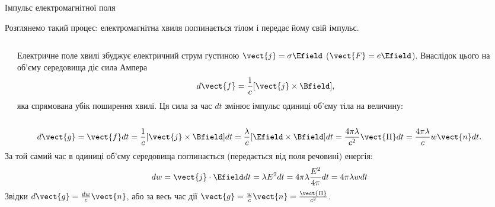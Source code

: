\documentclass[onlytextwidth]{beamer}
\begin{document}
\begin{frame}{Імпульс електромагнітної поля}{}
	\begin{block}{}
		Розглянемо такий процес: електромагнітна хвиля поглинається тілом і передає йому свій імпульс.
	\end{block}
	\begin{columns}
		\begin{column}{0.4\linewidth}\centering
			
		\end{column}
		\begin{column}{0.6\linewidth}
			\begin{block}{}\justifying\small
				Електричне поле хвилі збуджує електричний струм густиною $ \vect{j} = \sigma\Efield $ ($ \vect{F} = e\Efield $). Внаслідок цього на
				об'єму середовища діє сила Ампера
				\begin{equation*}
					d\vect{f} = \frac1c[\vect{j}\times\Bfield],
				\end{equation*}
				яка спрямована убік поширення хвилі. Ця сила за час $dt$ змінює імпульс одиниці об'єму тіла на величину:

			\end{block}
		\end{column}
	\end{columns}
	\begin{block}{}\justifying
		\begin{equation*}
			d\vect{g} = \vect{f} dt =  \frac1c[\vect{j}\times\Bfield] dt = \frac{\lambda}{c}[\Efield \times\Bfield]dt =
			\frac{4\pi\lambda}{c^2}\vect{\Pi}dt
			=
			\frac{4\pi\lambda}{c} w \vect{n} dt.
		\end{equation*}
		За той самий час в одиниці об'єму середовища поглинається (передається від поля речовині) енергія:
		\begin{equation*}
			dw = \vect{j}\cdot\Efield dt = \lambda E^2dt = 4\pi\lambda \frac{E^2}{4\pi} dt = 4\pi\lambda w dt
		\end{equation*}
		Звідки $d\vect{g} = \frac{dw}c \vect{n}$, або за весь час дії $\vect{g} = \frac{w}{c} \vect{n} = \frac{\vect{\Pi}}{c^2}$.
	\end{block}
\end{frame}
\end{document}
